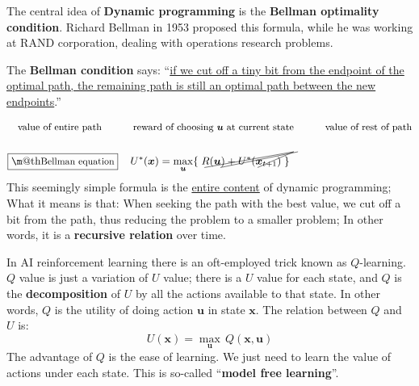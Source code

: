 \documentclass[orivec]{llncs}
\makeatletter
\newcommand{\tikzmark}[1]{\tikz[overlay,remember picture] \node (#1) {};}
\newcommand{\vect}[1]{\boldsymbol{#1}}
\renewcommand{\boxed}[1]{\fbox{\m@th$\displaystyle\scalebox{0.9}{#1}$} \,}
\makeatother
\begin{document}
The central idea of \textbf{Dynamic programming} is the \textbf{Bellman optimality condition}. Richard Bellman in 1953 proposed this formula, while he was working at RAND corporation, dealing with operations research problems.

The \textbf{Bellman condition} says:  ``\uline{if we cut off a tiny bit from the endpoint of the optimal path, the remaining path is still an optimal path between the new endpoints}.''

\begin{eqnarray}
& \mbox{\footnotesize value of entire path} \tikzmark{uEntire} \quad \quad \mbox{\footnotesize reward of choosing $\vect{u}$ at current state} \tikzmark{rCurrent} \quad \quad \mbox{\footnotesize value of rest of path} \tikzmark{uRest} \nonumber \\
\nonumber \\
& \boxed{\mbox{Bellman equation}} \quad \tikzmark{UEntire} U^*(\vect{x}) = \max\limits_{\vect{u}} \{ \; \tikzmark{RCurrent} R(\vect{u}) + \tikzmark{URest} U^*(\vect{x}_{t+1}) \; \}
\begin{tikzpicture}[overlay,remember picture]
  \draw (uEntire.center) +(-30pt,-3pt) -- ([shift={(4pt,12pt)}]UEntire.center);
  \draw (rCurrent.center) +(-80pt,-3pt) -- ([shift={(4pt,12pt)}]RCurrent.center);
  \draw (uRest.center) +(-65pt,-3pt) -- ([shift={(8pt,12pt)}]URest.center);
\end{tikzpicture}
\end{eqnarray}
This seemingly simple formula is the \uline{entire content} of dynamic programming;  What it means is that:  When seeking the path with the best value, we cut off a bit from the path, thus reducing the problem to a smaller problem;  In other words, it is a \textbf{recursive relation} over time.

In AI reinforcement learning there is an oft-employed trick known as $Q$-learning.  $Q$ value is just a variation of $U$ value;  there is a $U$ value for each state, and $Q$ is the \textbf{decomposition} of $U$ by all the actions available to that state.  In other words, $Q$ is the utility of doing action $\vect{u}$ in state $\vect{x}$.  The relation between $Q$ and $U$ is:
\begin{equation}
U(\vect{x}) = \max\limits_{\vect{u}} \, Q(\vect{x}, \vect{u})
\end{equation}
The advantage of $Q$ is the ease of learning.  We just need to learn the value of actions under each state.  This is so-called ``\textbf{model free learning}''.
\end{document}
